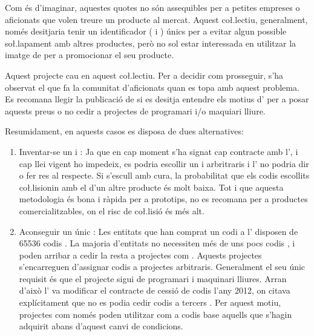 Com és d'imaginar, aquestes quotes no són assequibles per a petites empreses
o aficionats que volen treure un producte al mercat. Aquest co\l.lectiu,
generalment, només desitjaria tenir un identificador ( i )
únics per a evitar algun possible so\l.lapament amb altres productes, però
no sol estar interessada en utilitzar la imatge de  per a promocionar
el seu producte.

Aquest projecte cau en aquest co\l.lectiu. Per a decidir com prosseguir, s'ha
observat el que fa la comunitat d'aficionats quan es topa amb aquest problema.
Es recomana llegir la publicació de \cite{Johnson2023usb} si es desitja entendre
els motius d' per a posar aquests preus o no cedir 
a projectes de programari i/o maquiari lliure.

Resumidament, en aquests casos es disposa de dues alternatives:

\begin{enumerate}
    \item Inventar-se un  i : Ja que en cap moment s'ha
    signat cap contracte amb l', i cap llei vigent ho impedeix, es
    podria escollir un  i  arbritraris i l' no
    podria dir o fer res al respecte. Si s'escull amb cura, la
    probabilitat que els codis escollits co\l.lisionin amb el d'un altre
    producte és molt baixa. Tot i que aquesta metodologia és bona i ràpida per a
    prototips, no es recomana per a productes comercialitzables, on el risc
    de co\l.lisió és més alt.
    \item Aconseguir un únic : Les entitats que han comprat un codi
     a l' disposen de
    \num[round-mode=places,round-precision=0]{65536} codis . La majoria
    d'entitats no necessiten més de uns pocs codis , i poden arribar
    a cedir la resta a projectes com  \cite{OpenMokoUSB}. Aquests
    projectes s'encarreguen d'assignar codis  a projectes arbitraris.
    Generalment el seu únic requisit és que el projecte sigui de programari
    i maquinari lliures. Arran d'això l' va modificar el contracte
    de cessió de codis  l'any 2012, on citava explícitament que no es
    podia cedir codis  a tercers \cite{Johnson2023usb}. Per aquest
    motiu, projectes com  només poden utilitzar com a codis
     base aquells que s'hagin adquirit abans d'aquest canvi
    de condicions.
\end{enumerate}

